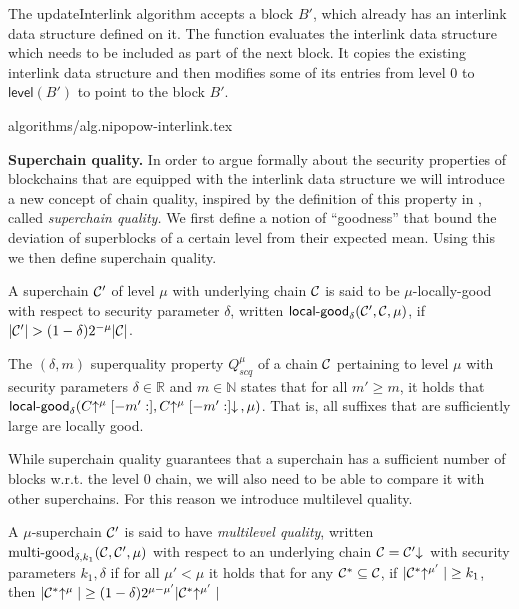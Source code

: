 The updateInterlink algorithm accepts a block $B'$, which already has an
interlink data structure defined on it. The function evaluates the
interlink data structure which needs to be included as part of the next block.
It copies the existing interlink data structure and
then modifies some of its entries from level $0$ to $\textsf{level}(B')$ to
point to the block $B'$.

{algorithms/alg.nipopow-interlink.tex}

\noindent
{\bf Superchain quality.} In order to argue formally about the security
properties of blockchains that are equipped with the interlink
data structure we will introduce a new concept of chain quality,
inspired by the definition of this property in \cite{backbone},
called {\em superchain quality.}
We first define a notion of ``goodness'' that bound the deviation
of superblocks of a certain level from their expected mean. Using
this we then define superchain quality.

\begin{definition}
A superchain $\mathcal{C}'$ of level
$\mu$ with underlying chain $\mathcal{C}$ is said to be $\mu$-\textnormal{locally-good}
with respect to security parameter $\delta$, written
$\textsf{local-good}_{\delta}(\mathcal{C}', \mathcal{C}, \mu)$, if $|\mathcal{C}'| > (1 -
\delta)2^{-\mu}|\mathcal{C}|$.
\end{definition}

\begin{definition}
The $(\delta, m)$ superquality property
$Q^\mu_{scq}$ of a chain $\mathcal{C}$ pertaining to level $\mu$ with security
parameters $\delta \in \mathbb{R}$ and $m \in \mathbb{N}$ states that for all
$m' \geq m$, it holds that $\textsf{local-good}_{\delta}(C\negthickspace\uparrow^\mu[-m':],
C\negthickspace\uparrow^\mu[-m':]\negthickspace\downarrow\,, \mu)$. That is, all suffixes that are
sufficiently large are locally good.
\end{definition}

While superchain quality guarantees that a superchain has a sufficient number
of blocks w.r.t. the level 0 chain, we will also need to be able to compare 
it with other superchains. For this reason we introduce multilevel quality. 

\begin{definition}
A $\mu$-superchain $\mathcal{C}'$ is said to have \textit{multilevel quality}, written
$\textnormal{multi-good}_{\delta, k_1}(\mathcal{C}, \mathcal{C}', \mu)$ with respect to an
underlying chain $\mathcal{C} = \mathcal{C}'\negthickspace\downarrow\,$ with security parameters $k_1,
\delta$ if for all $\mu' < \mu$ it holds that for any $\mathcal{C}^* \subseteq \mathcal{C}$,
if $|\mathcal{C}^*\negthickspace\uparrow^{\mu'}| \geq k_1$, then $|\mathcal{C}^*\negthickspace\uparrow^{\mu}| \geq (1 -
\delta)2^{\mu - \mu'}|\mathcal{C}^*\negthickspace\uparrow^{\mu'}|$
\end{definition}

